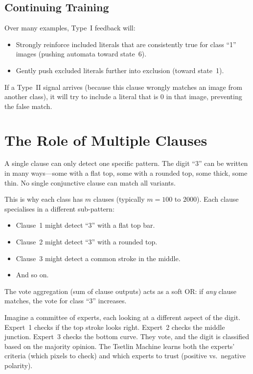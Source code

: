 \subsection{Continuing Training}

Over many examples, Type~I feedback will:
\begin{itemize}
  \item Strongly reinforce included literals that are consistently
    true for class ``1'' images (pushing automata toward state~6).
  \item Gently push excluded literals further into exclusion (toward
    state~1).
\end{itemize}

If a Type~II signal arrives (because this clause wrongly matches an
image from another class), it will try to include a literal that is
0 in that image, preventing the false match.


\section{The Role of Multiple Clauses}
\label{sec:multiple-clauses}

A single clause can only detect one specific pattern. The digit ``3''
can be written in many ways---some with a flat top, some with a
rounded top, some thick, some thin. No single conjunctive clause can
match all variants.

This is why each class has $m$ clauses (typically $m = 100$ to
$2000$). Each clause specialises in a different sub-pattern:

\begin{itemize}
  \item Clause~1 might detect ``3'' with a flat top bar.
  \item Clause~2 might detect ``3'' with a rounded top.
  \item Clause~3 might detect a common stroke in the middle.
  \item And so on.
\end{itemize}

The vote aggregation (sum of clause outputs) acts as a soft OR: if
\emph{any} clause matches, the vote for class ``3'' increases.

\begin{analogy}
Imagine a committee of experts, each looking at a different aspect of
the digit. Expert~1 checks if the top stroke looks right. Expert~2
checks the middle junction. Expert~3 checks the bottom curve. They
vote, and the digit is classified based on the majority opinion. The
Tsetlin Machine learns both the experts' criteria (which pixels to
check) and which experts to trust (positive vs.\ negative polarity).
\end{analogy}


